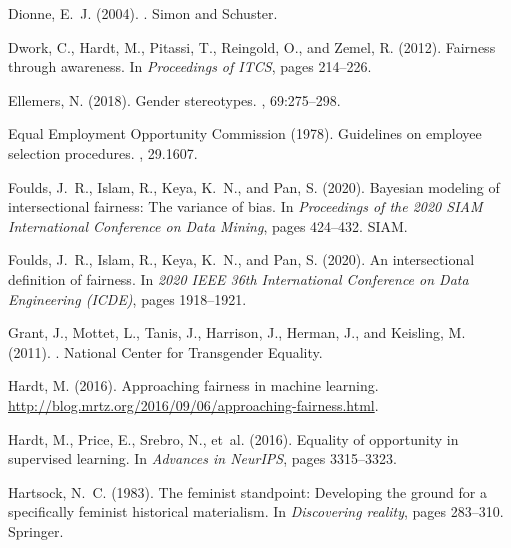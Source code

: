 \documentclass[11pt,dvipdfm]{article}
\begin{document}
\begin{thebibliography}{}
	Dionne, E.~J. (2004).
	.
	\newblock Simon and Schuster.
	
	Dwork, C., Hardt, M., Pitassi, T., Reingold, O., and Zemel, R. (2012).
	\newblock Fairness through awareness.
	\newblock In {\em Proceedings of ITCS}, pages 214--226.
	
	Ellemers, N. (2018).
	\newblock Gender stereotypes.
	, 69:275--298.
	
	{Equal Employment Opportunity Commission} (1978).
	\newblock Guidelines on employee selection procedures.
	, 29.1607.
	
	Foulds, J.~R., Islam, R., Keya, K.~N., and Pan, S. (2020).
	\newblock Bayesian modeling of intersectional fairness: The variance of bias.
	\newblock In {\em Proceedings of the 2020 SIAM International Conference on Data
		Mining}, pages 424--432. SIAM.
	
	{Foulds}, J.~R., {Islam}, R., {Keya}, K.~N., and {Pan}, S. (2020).
	\newblock An intersectional definition of fairness.
	\newblock In {\em 2020 IEEE 36th International Conference on Data Engineering
		(ICDE)}, pages 1918--1921.
	
	Grant, J., Mottet, L., Tanis, J., Harrison, J., Herman, J., and Keisling, M.
	(2011).
	.
	\newblock National Center for Transgender Equality.
	
	Hardt, M. (2016).
	\newblock Approaching fairness in machine learning.
	\url{http://blog.mrtz.org/2016/09/06/approaching-fairness.html}.
	
	Hardt, M., Price, E., Srebro, N., et~al. (2016).
	\newblock Equality of opportunity in supervised learning.
	\newblock In {\em Advances in NeurIPS}, pages 3315--3323.
	
	Hartsock, N.~C. (1983).
	\newblock The feminist standpoint: Developing the ground for a specifically
	feminist historical materialism.
	\newblock In {\em Discovering reality}, pages 283--310. Springer.
	

\end{thebibliography}
\end{document}
